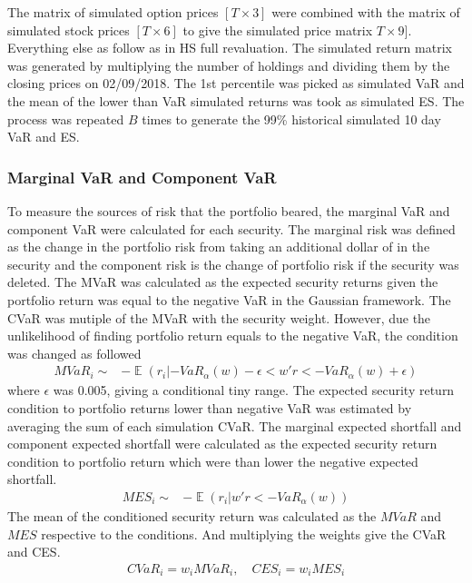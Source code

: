 \documentclass[a4paper,11pt]{article}
\DeclareMathOperator{\E}{\mathbb{E}}
\begin{document}
\begin{flushleft}
\begin{itemize}
The matrix of simulated option prices  $[T \times 3]$ were combined with the matrix of simulated stock prices $[T \times 6]$ to give the simulated price matrix  $T \times 9]$. Everything else as follow as in HS full revaluation. The simulated return matrix was generated by multiplying the number of holdings and dividing them by the closing prices on 02/09/2018. The 1st percentile was picked as simulated VaR and the mean of the lower than VaR simulated returns was took as simulated ES. The process was repeated $B$ times to generate the 99\%  historical simulated 10 day VaR and ES.

\subsubsection*{Marginal VaR and Component VaR}
To measure the sources of risk that the portfolio beared, the marginal VaR and component VaR were calculated for each security. The marginal risk was defined as the change in the portfolio risk from taking an additional dollar of in the security and the component risk is the change of portfolio risk if the security was deleted. The MVaR was calculated as the expected security returns given the portfolio return was equal to the negative VaR in the Gaussian framework. The CVaR was mutiple of the MVaR with the security weight. However, due the unlikelihood of finding portfolio return equals to the negative VaR, the condition was changed as followed 
\begin{align*}
MVaR_i \sim  & - \E \left(r_i | -VaR_\alpha \left(w\right) - \epsilon < w'r < - VaR_\alpha \left(w\right) + \epsilon \right)
\end{align*}
where $\epsilon$ was 0.005, giving a conditional tiny range. The expected security return condition to portfolio returns lower than negative VaR was estimated by averaging the sum of each simulation CVaR. The marginal expected shortfall and component expected shortfall were calculated as the expected security return condition to portfolio return which were than lower the negative expected shortfall. 
\begin{align*}
MES_i \sim  & - \E \left(r_i | w'r < - VaR_\alpha \left(w\right) \right)
\end{align*}
The mean of the conditioned security return was calculated as the $MVaR$ and $MES$ respective to the conditions. And multiplying the weights give the CVaR and CES. 
\begin{align*}
CVaR_i = w_i MVaR_i , \quad
CES_i = w_i MES_i 
\end{align*}

\end{itemize}
\end{flushleft}
\end{document}
